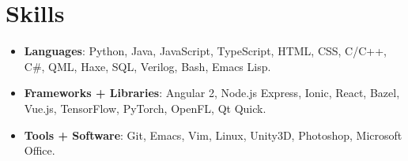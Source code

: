 \documentclass[10pt]{article}
\begin{document}
\section{Skills}
{
  \begin{itemize} \setlength\itemsep{0pt}
  \item
    \textbf{Languages}:
    Python,
    Java,
    JavaScript,
    TypeScript,
    HTML,
    CSS,
    C/C++,
    C\#,
    QML,
    Haxe,
    SQL,
    Verilog,
    Bash,
    Emacs Lisp.

  \item
    \textbf{Frameworks + Libraries}: Angular 2, Node.js Express, Ionic, React, Bazel, Vue.js, TensorFlow, PyTorch, OpenFL, Qt Quick.

  \item
    \textbf{Tools + Software}: Git, Emacs, Vim, Linux, Unity3D, Photoshop, Microsoft Office.
  \end{itemize}
}
\end{document}

